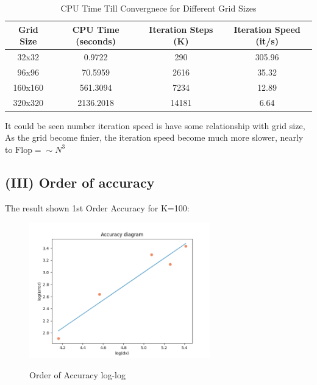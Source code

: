 \documentclass[12pt]{article}
\begin{document}
\begin{table}[ht]
    \centering
    \begin{tabular}{c|c | c | c}
    \hline
    Grid Size & CPU Time (seconds) & Iteration Steps (K) & Iteration Speed (it/s)\\ \hline
    32x32     & 0.9722             & 290                 & 305.96  \\ \hline
    96x96     & 70.5959            & 2616                & 35.32   \\ \hline
    160x160   & 561.3094           & 7234                & 12.89   \\ \hline
    320x320   & 2136.2018          & 14181               & 6.64    \\ \hline
    \end{tabular}
    \caption{CPU Time Till Convergnece for Different Grid Sizes}
    \label{tab:cpu_time}
\end{table}
    
It could be seen number iteration speed is have some relationship with grid size,
As the grid become finier, the iteration speed become much more slower, nearly
to $\text{Flop} =\sim N^{3}$



\subsection{(III) Order of accuracy}

The result shown 1st Order Accuracy for K=100:




\begin{figure}[H]
    \centering
    \includegraphics[width=0.7\textwidth]{orderofAccuracy.png}
    \label{orderofAccuracy.png}
    \caption{Order of Accuracy log-log}
\end{figure}
\end{document}
